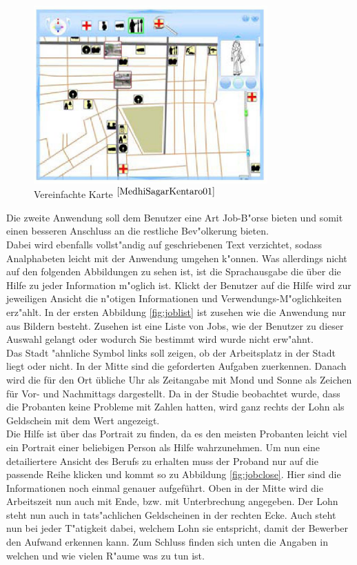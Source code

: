 \begin{figure}[h]
	\centering
		\includegraphics[width=0.8\textwidth]{Daten/map_simple.PNG}
	\caption{Vereinfachte Karte $^{\ref{MedhiSagarKentaro01}}$}
	\label{fig:mapsimple}
\end{figure}
Die zweite Anwendung soll dem Benutzer eine Art Job-B"orse bieten und somit einen besseren Anschluss an die restliche Bev"olkerung bieten.\\
Dabei wird ebenfalls vollst"andig auf geschriebenen Text verzichtet, sodass Analphabeten leicht mit der Anwendung umgehen k"onnen.
Was allerdings nicht auf den folgenden Abbildungen zu sehen ist, ist die Sprachausgabe die über die Hilfe zu jeder Information m"oglich ist. Klickt der Benutzer auf die Hilfe wird zur jeweiligen Ansicht die n"otigen Informationen und Verwendungs-M"oglichkeiten erz"ahlt.
In der ersten Abbildung \ref{fig:joblist} ist zusehen wie die Anwendung nur aus Bildern besteht. Zusehen ist eine Liste von Jobs, wie der Benutzer zu dieser Auswahl gelangt oder wodurch Sie bestimmt wird wurde nicht erw"ahnt.\\
Das Stadt "ahnliche Symbol links soll zeigen, ob der Arbeitsplatz in der Stadt liegt oder nicht. In der Mitte sind die geforderten Aufgaben zuerkennen. Danach wird die für den Ort übliche Uhr als Zeitangabe mit Mond und Sonne als Zeichen für Vor- und Nachmittags dargestellt. Da in der Studie beobachtet wurde, dass die Probanten keine Probleme mit Zahlen hatten, wird ganz rechts der Lohn als Geldschein mit dem Wert angezeigt.\\
Die Hilfe ist über das Portrait zu finden, da es den meisten Probanten leicht viel ein Portrait einer beliebigen Person als Hilfe wahrzunehmen. Um nun eine detailiertere Ansicht des Berufs zu erhalten muss der Proband nur auf die passende Reihe klicken und kommt so zu Abbildung \ref{fig:jobclose}.
Hier sind die Informationen noch einmal genauer aufgeführt. Oben in der Mitte wird die Arbeitszeit nun auch mit Ende, bzw. mit Unterbrechung angegeben. Der Lohn steht nun auch in tats"achlichen Geldscheinen in der rechten Ecke. Auch steht nun bei jeder T"atigkeit dabei, welchem Lohn sie entspricht, damit der Bewerber den Aufwand erkennen kann. Zum Schluss finden sich unten die Angaben in welchen und wie vielen R"aume was zu tun ist.

